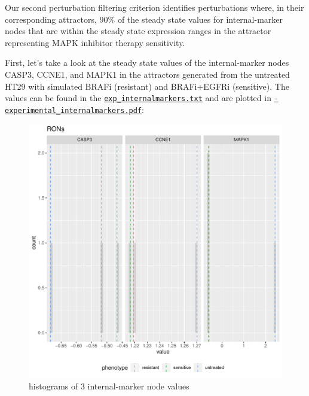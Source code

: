 \documentclass[
]{book}
\begin{document}
Our second perturbation filtering criterion identifies perturbations where, in their corresponding attractors, 90\% of the steady state values for internal-marker nodes that are within the steady state expression ranges in the attractor representing MAPK inhibitor therapy sensitivity.

First, let's take a look at the steady state values of the internal-marker nodes CASP3, CCNE1, and MAPK1 in the attractors generated from the untreated HT29 with simulated BRAFi (resistant) and BRAFi+EGFRi (sensitive). The values can be found in the \href{https://github.com/VeraLiconaResearchGroup/Netisce/blob/main/colorectal_cancer_validation/results/3-marker-nodes/exp_internalmarkers.txt}{\texttt{exp\_internalmarkers.txt}} and are plotted in \href{https://github.com/VeraLiconaResearchGroup/Netisce/blob/main/colorectal_cancer_validation/results/3-marker-nodes/experimental_internalmarkers.pdf}{\texttt{-experimental\_internalmarkers.pdf}}:

\begin{figure}[H]

{\centering \includegraphics[width=9.72in]{crc/results/3-marker-nodes/experimental_internalmarkers} 

}

\caption{histograms of 3 internal-marker node values}\label{fig:unnamed-chunk-39}
\end{figure}
\end{document}
